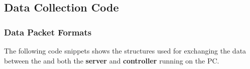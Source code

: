 \subsection{Data Collection Code}
\label{sec:DCC}

\subsubsection{Data Packet Formats}
The following code snippets shows the structures used for exchanging the data between the \LEGO and both the \textbf{server} and \textbf{controller} running on the PC.




